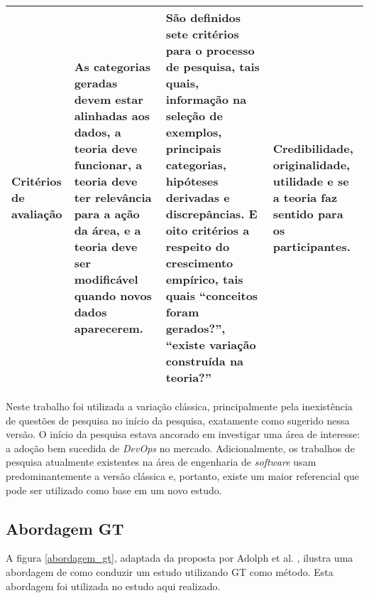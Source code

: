 \begin{table}[hb!]
{\begin{tabular}{|p{3cm}|p{5.7cm}|p{5.7cm}|p{5.7cm}|}
\textbf{Critérios de avaliação}
& As categorias geradas devem estar alinhadas aos dados, a teoria deve funcionar, a teoria deve ter relevância para a ação da área, e a teoria deve ser modificável quando novos dados aparecerem.
& São definidos sete critérios para o processo de pesquisa, tais quais, informação na seleção de exemplos, principais categorias, hipóteses derivadas e discrepâncias. E oito critérios a respeito do crescimento empírico, tais quais ``conceitos foram gerados?'', ``existe variação construída na teoria?''
& Credibilidade, originalidade, utilidade e se a teoria faz sentido para os participantes. \\
\hline

\end{tabular}}
\end{table}

Neste trabalho foi utilizada a variação clássica, principalmente pela
inexistência de questões de pesquisa no início da pesquisa, exatamente como
sugerido nessa versão. O início da pesquisa estava ancorado em investigar uma
área de interesse: a adoção bem sucedida de \textit{DevOps} no mercado.
Adicionalmente, os trabalhos de pesquisa atualmente existentes na área
de engenharia de \textit{software} usam predominantemente a versão clássica
\cite{stol2016grounded} e, portanto, existe um maior referencial que pode ser
utilizado como base em um novo estudo.

\subsection{Abordagem \acrshort{GT}}

A figura \ref{abordagem_gt}, adaptada da proposta por Adolph et al.
\cite{using_gt_adolph}, ilustra uma abordagem de como conduzir um estudo
utilizando \acrshort{GT} como método. Esta abordagem foi utilizada no estudo
aqui realizado.

%

